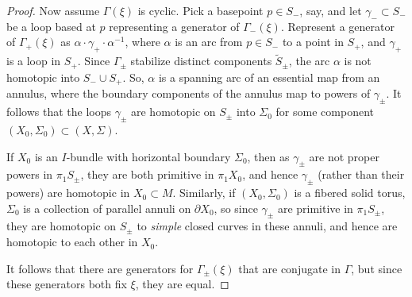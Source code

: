 \documentclass[12pt]{amsart}
\theoremstyle{definition}
\theoremstyle{remark}
\begin{document}
\begin{proof}
Now assume $\Gamma(\xi)$ is cyclic. Pick a basepoint $p\in S_-$, say, and let $\gamma_- \subset S_-$  be a loop based at $p$ representing a generator of $\Gamma_-(\xi)$. Represent a generator of $\Gamma_+(\xi)$ as $\alpha \cdot \gamma_+ \cdot \alpha^{-1}$, where $\alpha $ is an arc from $p\in S_-$ to a point in $S_+$, and $\gamma_+$ is a loop in $S_+$.  Since $\Gamma_\pm$ stabilize distinct components $\tilde S_\pm$, the arc $\alpha$ is not homotopic into $S_-\cup S_+$. So, $\alpha$ is a spanning arc of an essential map from an annulus, where the boundary components of the annulus map to powers of $\gamma_\pm$. It follows that the loops $\gamma_\pm$ are homotopic on $ S_\pm$ into $\Sigma_0$ for some component $(X_0,\Sigma_0) \subset (X,\Sigma)$.
	
	If $X_0$ is an $I$-bundle with horizontal boundary $\Sigma_0$, then as $\gamma_\pm$ are not proper powers in $\pi_1 S_\pm$, they are both primitive in $\pi_1 X_0$, and hence $\gamma_\pm$ (rather than their powers) are homotopic in $X_0 \subset M$. Similarly, if $(X_0,\Sigma_0)$ is a fibered solid torus, $\Sigma_0$ is a collection of parallel annuli on $\partial X_0$, so since $\gamma_\pm$ are primitive in $\pi_1 S_\pm$, they are homotopic on $S_\pm$ to \emph{simple} closed curves in these annuli, and hence are homotopic to each other in $X_0$. 
	
	It follows that there are generators for $\Gamma_\pm(\xi)$ that are conjugate in $\Gamma$, but since these generators both fix $\xi$, they are equal.
\end{proof}
\end{document}
